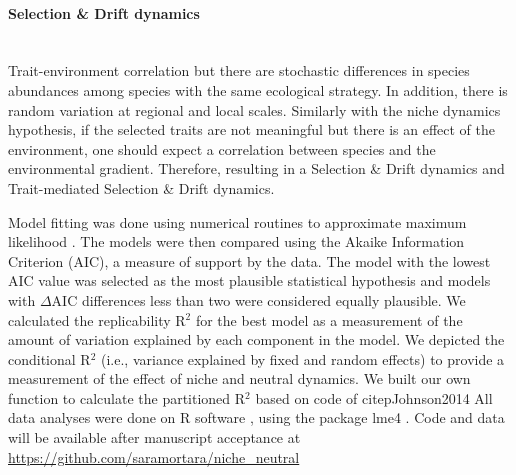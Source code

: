 \documentclass[12pt]{article}
\begin{document}
\begin{mdframed}[style=exampledefault]
\begin{singlespacing}
\paragraph{{\color{nineu}{$\blacksquare$}} Selection \& Drift dynamics} ~\\ Trait-environment correlation but there are stochastic differences in species abundances among species with the same ecological strategy. In addition, 
there is random variation at regional and local scales. Similarly with the niche dynamics hypothesis, if the selected traits are not meaningful but there is an effect of the environment, one should expect a correlation between species and the environmental gradient. Therefore, resulting in a Selection \& Drift dynamics and Trait-mediated Selection \& Drift dynamics.    

\end{singlespacing}

\end{mdframed}

Model fitting was done using numerical routines to approximate maximum
likelihood \citep{Bates2013}. The models were then compared using the
Akaike Information Criterion (AIC), a measure of support by the data.
The model with the lowest AIC value was selected as the most plausible
statistical hypothesis and models with {$\Delta$}AIC differences less
than two were considered equally plausible. We calculated the
replicability R${^2}$ \citep{Nakagawa2013}
for the best model as a measurement of the amount of variation
explained by each component in the model.
We depicted the conditional
R${^2}$ (i.e., variance explained by fixed and random effects) to
provide a measurement of the effect of niche and neutral dynamics.
We built our own function to calculate the partitioned R${^2}$ based on
code of citep{Johnson2014}
All data analyses
were done on R software \citep{RCoreDevelopmentTeam2009}, using the
package lme4 \citep{Bates2013}.
Code and data will be available after manuscript acceptance at
\url{https://github.com/saramortara/niche\_neutral} %
\end{document}
